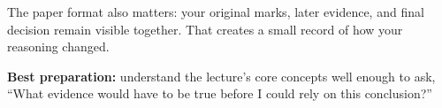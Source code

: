 \documentclass[10pt]{article}
\begin{document}
The paper format also matters: your original marks, later evidence, and final decision remain visible together. That creates a small record of how your reasoning changed.

\textbf{Best preparation:} understand the lecture's core concepts well enough to ask, ``What evidence would have to be true before I could rely on this conclusion?''
\end{document}
